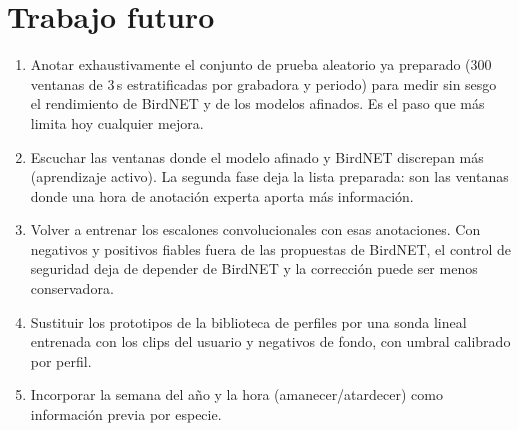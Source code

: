\documentclass[11pt,a4paper]{article}
\begin{document}


\section{Trabajo futuro}
\begin{enumerate}
  \item Anotar exhaustivamente el conjunto de prueba aleatorio ya preparado (300 ventanas de 3\,s estratificadas por grabadora y periodo) para medir sin sesgo
        el rendimiento de BirdNET y de los modelos afinados. Es el paso que más limita hoy cualquier mejora.
  \item Escuchar las ventanas donde el modelo afinado y BirdNET discrepan más (aprendizaje activo). La segunda fase deja la lista preparada: son las
        ventanas donde una hora de anotación experta aporta más información.
  \item Volver a entrenar los escalones convolucionales con esas anotaciones. Con negativos y positivos fiables fuera de las propuestas de BirdNET,
        el control de seguridad deja de depender de BirdNET y la corrección puede ser menos conservadora.
  \item Sustituir los prototipos de la biblioteca de perfiles por una sonda lineal entrenada con los clips del usuario y negativos de fondo,
        con umbral calibrado por perfil.
  \item Incorporar la semana del año y la hora (amanecer/atardecer) como información previa por especie.
\end{enumerate}

\end{document}
